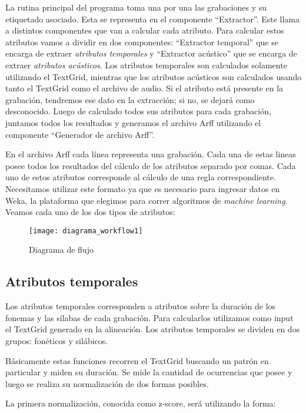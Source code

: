 La rutina principal del programa toma una por una las grabaciones y su etiquetado asociado. Esta se representa en el componente ``Extractor''. Este llama a distintos componentes que van a calcular cada atributo. Para calcular estos atributos vamos a dividir en dos componentes: ``Extractor temporal'' que se encarga de extraer \textit{atributos temporales} y ``Extractor acústico'' que se encarga de extraer \textit{atributos acústicos}. Los atributos temporales son calculados solamente utilizando el TextGrid, mientras que los atributos acústicos son calculados usando tanto el TextGrid como el archivo de audio. Si el atributo está presente en la grabación, tendremos ese dato en la extracción; si no, se dejará como desconocido. Luego de calculado todos sus atributos para cada grabación, juntamos todos los resultados y generamos el archivo Arff utilizando el componente ``Generador de archivo Arff''.

En el archivo Arff cada línea representa una grabación.  Cada una de estas lineas posee todos los resultados del cálculo de los atributos separado por comas. Cada uno de estos atributos corresponde al cálculo de una regla correspondiente. Necesitamos utilizar este formato ya que es necesario para ingresar datos en Weka, la plataforma que elegimos para correr algoritmos de \textit{machine learning}. Veamos cada uno de los dos tipos de atributos:

\begin{figure}[h!]
    \centerline{\texttt{[image: diagrama\_workflow1]} }
    \caption{Diagrama de flujo}
    \label{workflow}
\end{figure}

\subsection{Atributos temporales}

Los atributos temporales corresponden a atributos sobre la duración de los fonemas y las sílabas de cada grabación. Para calcularlos utilizamos como input el TextGrid generado en la alineación. Los atributos temporales se dividen en dos grupos: fonéticos y silábicos. 

Básicamente estas funciones recorren el TextGrid buscando un patrón en particular y miden su duración. Se mide la cantidad de ocurrencias que posee y luego se realiza su normalización de dos formas posibles. 

La primera normalización, conocida como z-score, será utilizando la forma:

